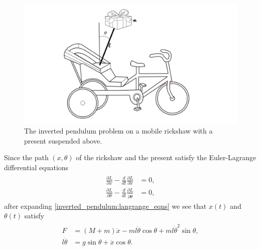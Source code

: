 \begin{figure}
\centering
\includegraphics[width=\textwidth]{rickshaw_img.png}
\caption{The inverted pendulum problem on a mobile rickshaw with a present suspended above.
}
\label{fig:inverted_pendulum:rickshaw_diagram}
\end{figure}

Since the path $(x,\theta)$ of the rickshaw and the present satisfy the Euler-Lagrange differential equations 
\begin{align}
	\begin{split}
\frac{\partial L}{\partial x} - \frac{d}{dt} \frac{\partial L}{\partial \dot{x}} &= 0,\\
\frac{\partial L}{\partial \theta} - \frac{d}{dt} \frac{\partial L}{\partial \dot{\theta}} &= 0,
	\end{split}\label{inverted_pendulum:langrange_eqns}
\end{align}
after expanding \eqref{inverted_pendulum:langrange_eqns} we see that $x(t)$ and $\theta(t)$ satisfy
\begin{align}
	\begin{split}
		F &= (M + m)\ddot{x} - ml\ddot{\theta} \cos \theta + ml \dot{\theta}^2 \sin \theta,\\
		l \ddot{\theta} &= g \sin \theta + \ddot{x} \cos \theta.
	\end{split}\label{inverted_pendulum:langrange_eqns_explicit}
\end{align}



